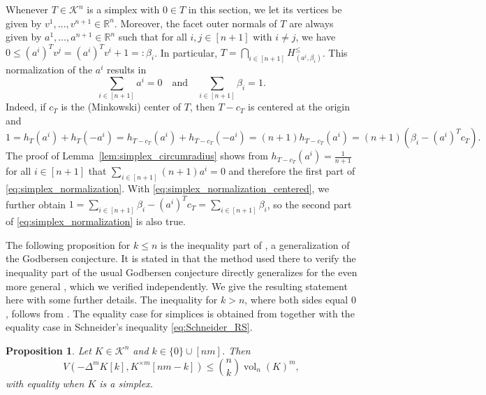 \documentclass{amsart}
\newtheorem{proposition}[theorem]{Proposition}
\newcommand\R{\mathbb{R}}
\newcommand\CK{\mathcal{K}}
\DeclareMathOperator{\vol}{vol}
\newcommand{\diag}[2]{\Delta^{#1} #2}
\newcommand{\cartesian}[2]{#1^{\times #2}}
\begin{document}
Whenever $T \in \CK^n$ is a simplex with $0 \in T$ in this section,
we let its vertices be given by $v^1, \dots, v^{n+1} \in \R^n$.
Moreover, the facet outer normals of $T$ are always given by $a^1, \dots, a^{n+1} \in \R^n$ such that for all $i,j \in [n+1]$ with $i \neq j$,
we have $0 \leq (a^i)^T v^j = (a^i)^T v^i + 1 =: \beta_i$.
In particular, $T = \bigcap_{i \in [n+1]} H_{(a^i,\beta_i)}^\leq$.
This normalization of the $a^i$ results in
\begin{equation} \label{eq:simplex_normalization}
    \sum_{i \in [n+1]} a^i = 0
        \quad \text{and} \quad
    \sum_{i \in [n+1]} \beta_i = 1.
\end{equation}
Indeed, if $c_T$ is the (Minkowski) center of $T$, then $T - c_T$ is centered at the origin and
\begin{equation}\label{eq:simplex_normalization_centered}
    1
    = h_T(a^i) + h_T(-a^i)
    = h_{T-c_T}(a^i) + h_{T-c_T}(-a^i)
    = (n+1) h_{T-c_T}(a^i)
    = (n+1) (\beta_i - (a^i)^T c_T).
\end{equation}
The proof of Lemma~\ref{lem:simplex_circumradius} shows from $h_{T-c_T}(a^i) = \frac{1}{n+1}$ for all $i \in [n+1]$ that $\sum_{i \in [n+1]} (n+1) a^i = 0$
and therefore the first part of \eqref{eq:simplex_normalization}.
With \eqref{eq:simplex_normalization_centered}, we further obtain
$1 = \sum_{i \in [n+1]} \beta_i - (a^i)^T c_T = \sum_{i \in [n+1]} \beta_i$,
so the second part of \eqref{eq:simplex_normalization} is also true.


The following proposition for $k \leq n$ is the inequality part of \cite[Conjecture~$2$]{2025:Kotrbaty}, a generalization of the Godbersen conjecture.
It is stated in \cite{2026:KotrbatyMouamine} that the method used there to verify the inequality part of the usual Godbersen conjecture directly generalizes for the even more general \cite[Conjecture~$1.3$]{2025:Kotrbaty}, which we verified independently.
We give the resulting statement here with some further details.
The inequality for $k > n$, where both sides equal $0$, follows from \cite[Theorem~$5.1.8$]{2014:Schneider}.
The equality case for simplices is obtained from \cite[Proposition~$3.2$]{2025:Kotrbaty} together with the equality case in Schneider's inequality \eqref{eq:Schneider_RS}.

\begin{proposition}\label{prop:Godbersen}
Let $K \in \CK^n$ and $k \in \{0\} \cup [nm]$.
Then
\[
    V(-\diag{m}{K}[k],\cartesian{K}{m}[nm-k])
    \leq \binom{n}{k} \vol_n(K)^m,
\]
with equality when $K$ is a simplex.
\end{proposition}
\end{document}
